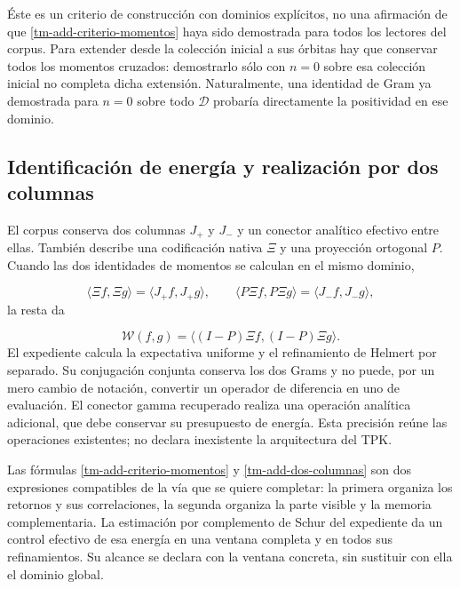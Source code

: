 Éste es un criterio de construcción con dominios explícitos, no una afirmación de que \eqref{tm-add-criterio-momentos} haya sido demostrada para todos los lectores del corpus. Para extender desde la colección inicial a sus órbitas hay que conservar todos los momentos cruzados: demostrarlo sólo con \(n=0\) sobre esa colección inicial no completa dicha extensión. Naturalmente, una identidad de Gram ya demostrada para \(n=0\) sobre todo \(\mathcal D\) probaría directamente la positividad en ese dominio.


\subsection{Identificación de energía y realización por dos columnas}
\label{tm-add-c6}
El corpus conserva dos columnas \(J_+\) y \(J_-\) y un conector analítico efectivo entre ellas. También describe una codificación nativa \(\Xi\) y una proyección ortogonal \(P\). Cuando las dos identidades de momentos se calculan en el mismo dominio,

\[
\langle\Xi f,\Xi g\rangle=\langle J_+f,J_+g\rangle,
\qquad
\langle P\Xi f,P\Xi g\rangle=\langle J_-f,J_-g\rangle,
\]
la resta da

\begin{equation}
\mathscr W(f,g)=\langle(I-P)\Xi f,(I-P)\Xi g\rangle.
\label{tm-add-dos-columnas}
\end{equation}
El expediente calcula la expectativa uniforme y el refinamiento de Helmert por separado. Su conjugación conjunta conserva los dos Grams y no puede, por un mero cambio de notación, convertir un operador de diferencia en uno de evaluación. El conector gamma recuperado realiza una operación analítica adicional, que debe conservar su presupuesto de energía. Esta precisión reúne las operaciones existentes; no declara inexistente la arquitectura del TPK.

Las fórmulas \eqref{tm-add-criterio-momentos} y \eqref{tm-add-dos-columnas} son dos expresiones compatibles de la vía que se quiere completar: la primera organiza los retornos y sus correlaciones, la segunda organiza la parte visible y la memoria complementaria. La estimación por complemento de Schur del expediente da un control efectivo de esa energía en una ventana completa y en todos sus refinamientos. Su alcance se declara con la ventana concreta, sin sustituir con ella el dominio global.



